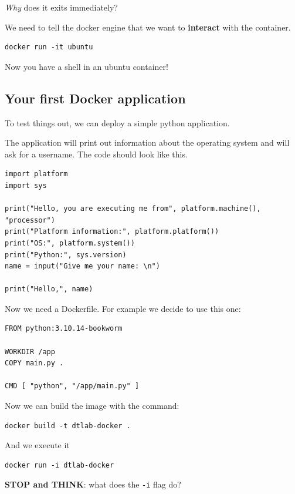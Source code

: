 \documentclass[11pt,a4paper]{article}
\begin{document}
\emph{Why} does it exits immediately?

We need to tell the docker engine that we want to \textbf{interact} with
the container.

\begin{verbatim}
docker run -it ubuntu
\end{verbatim}

Now you have a shell in an ubuntu container!

\subsection{Your first Docker
application}\label{your-first-docker-application}

To test things out, we can deploy a simple python application.

The application will print out information about the operating system
and will ask for a username. The code should look like this.

\begin{verbatim}
import platform
import sys

print("Hello, you are executing me from", platform.machine(), "processor")
print("Platform information:", platform.platform())
print("OS:", platform.system())
print("Python:", sys.version)
name = input("Give me your name: \n")

print("Hello,", name)
\end{verbatim}

Now we need a Dockerfile. For example we decide to use this one:

\begin{verbatim}
FROM python:3.10.14-bookworm

WORKDIR /app
COPY main.py .

CMD [ "python", "/app/main.py" ]
\end{verbatim}

Now we can build the image with the command:

\begin{verbatim}
docker build -t dtlab-docker .
\end{verbatim}

And we execute it

\begin{verbatim}
docker run -i dtlab-docker
\end{verbatim}

\textbf{STOP and THINK}: what does the \texttt{-i} flag do?
\end{document}
